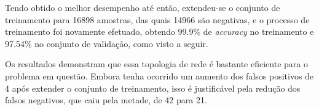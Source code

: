 \begin{table}[h!]
\end{table}

Tendo obtido o melhor desempenho até então, extendeu-se o conjunto de treinamento para 16898 amostras, das quais 14966 são negativas, e o processo de treinamento foi novamente efetuado, obtendo 99.9\% de \textit{accuracy} no treinamento e 97.54\% no conjunto de validação, como visto a seguir.

\begin{table}[h!]
\end{table}

Os resultados demonstram que essa topologia de rede é bastante eficiente para o problema em questão. Embora tenha ocorrido um aumento dos falsos positivos de 4 após extender o conjunto de treinamento, isso é justificável pela redução dos falsos negativos, que caiu pela metade, de 42 para 21.

